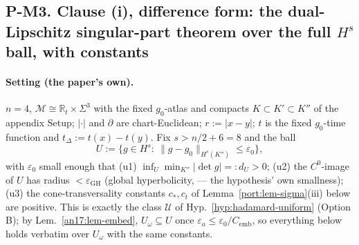 
\subsection*{P-M3. Clause (i), difference form: the dual-Lipschitz
singular-part theorem over the full $H^s$ ball, with constants}

\paragraph{Setting (the paper's own).} $n=4$, $\mathcal M\cong\mathbb
R_t\times\Sigma^3$ with the fixed $g_0$-atlas and compacts $K\subset
K'\subset K''$ of the appendix Setup; $|\cdot|$ and $\partial$ are
chart-Euclidean; $r:=|x-y|$; $t$ is the fixed $g_0$-time function and
$t_\Delta:=t(x)-t(y)$. Fix $s>n/2+6=8$ and the ball
\[
  U:=\bigl\{g\in H^s:\ \|g-g_0\|_{H^s(K'')}\le\varepsilon_0\bigr\},
\]
with $\varepsilon_0$ small enough that (u1) $\inf_U\min_{K''}|\det g|
=:d_U>0$; (u2) the $C^0$-image of $U$ has radius $<\varepsilon_{\mathrm
{GH}}$ (global hyperbolicity, \cite{ChruscielGrant2012} --- the
hypothesis' own smallness); (u3) the cone-transversality constants
$c_*,c_t$ of Lemma~\ref{port:lem-sigma}(iii) below are positive. This is
exactly the class $\mathcal U$ of Hyp.~\ref{hyp:hadamard-uniform} (Option B);
by Lem.~\ref{an17:lem-embed}, $U_\omega\subseteq U$ once $\varepsilon_a\le
\varepsilon_0/C_{\mathrm{emb}}$, so everything below holds verbatim over
$U_\omega$ with the same constants.

